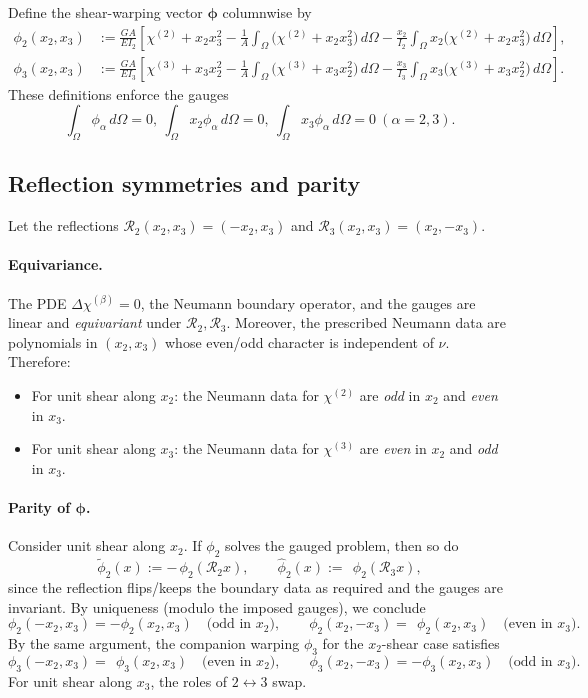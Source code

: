 Define the shear-warping vector \(\boldsymbol\phi\) columnwise by
\begin{align}
\phi_2(x_2,x_3) &:= \frac{GA}{E I_2}\left[\chi^{(2)} + x_2 x_3^2
-\frac{1}{A}\int_\Omega\!\big(\chi^{(2)} + x_2 x_3^2\big)\,d\Omega
-\frac{x_2}{I_2}\int_\Omega\!x_2\big(\chi^{(2)} + x_2 x_3^2\big)\,d\Omega\right],\\
\phi_3(x_2,x_3) &:= \frac{GA}{E I_3}\left[\chi^{(3)} + x_3 x_2^2
-\frac{1}{A}\int_\Omega\!\big(\chi^{(3)} + x_3 x_2^2\big)\,d\Omega
-\frac{x_3}{I_3}\int_\Omega\!x_3\big(\chi^{(3)} + x_3 x_2^2\big)\,d\Omega\right].
\end{align}
These definitions enforce the gauges
\[
\int_\Omega \phi_\alpha\,d\Omega=0,\ 
\int_\Omega x_2\phi_\alpha\,d\Omega=0,\ 
\int_\Omega x_3\phi_\alpha\,d\Omega=0\ (\alpha=2,3).
\]

\subsection*{Reflection symmetries and parity}
Let the reflections \(\mathcal R_2(x_2,x_3)=(-x_2,x_3)\) and \(\mathcal R_3(x_2,x_3)=(x_2,-x_3)\).

\paragraph{Equivariance.}
The PDE \(\Delta\chi^{(\beta)}=0\), the Neumann boundary operator, and the gauges are linear and \emph{equivariant} under \(\mathcal R_2,\mathcal R_3\). Moreover, the prescribed Neumann data are polynomials in \((x_2,x_3)\) whose even/odd character is independent of \(\nu\). Therefore:
\begin{itemize}
\item For unit shear along \(x_2\): the Neumann data for \(\chi^{(2)}\) are \emph{odd} in \(x_2\) and \emph{even} in \(x_3\).
\item For unit shear along \(x_3\): the Neumann data for \(\chi^{(3)}\) are \emph{even} in \(x_2\) and \emph{odd} in \(x_3\).
\end{itemize}

\paragraph{Parity of \(\boldsymbol\phi\).}
Consider unit shear along \(x_2\). If \(\phi_2\) solves the gauged problem, then so do
\[
\tilde\phi_2(x):= -\,\phi_2(\mathcal R_2 x),\qquad \hat\phi_2(x):= \ \ \phi_2(\mathcal R_3 x),
\]
since the reflection flips/keeps the boundary data as required and the gauges are invariant. By uniqueness (modulo the imposed gauges), we conclude
\[
\phi_2(-x_2,x_3)=-\phi_2(x_2,x_3)\quad\text{(odd in \(x_2\))},\qquad
\phi_2(x_2,-x_3)=\ \ \phi_2(x_2,x_3)\quad\text{(even in \(x_3\))}.
\]
By the same argument, the companion warping \(\phi_3\) for the \(x_2\)-shear case satisfies
\[
\phi_3(-x_2,x_3)=\ \ \phi_3(x_2,x_3)\quad\text{(even in \(x_2\))},\qquad
\phi_3(x_2,-x_3)=-\phi_3(x_2,x_3)\quad\text{(odd in \(x_3\))}.
\]
For unit shear along \(x_3\), the roles of \(2\leftrightarrow3\) swap.

